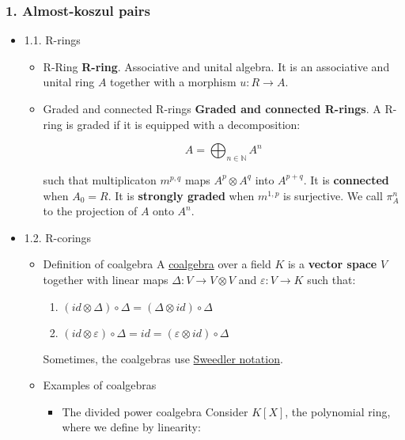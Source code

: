 \documentclass[11pt]{article}
\begin{document}
\subsubsection*{1. Almost-koszul pairs}
\label{sec-1-5-2}
\begin{itemize}
\item 1.1. R-rings
\label{sec-1-5-2-1}
\begin{itemize}
\item R-Ring
\label{sec-1-5-2-1-1}
\textbf{R-ring}. Associative and unital algebra. It is an associative and 
unital ring $A$ together with a morphism $u : R \longrightarrow A$.

\item Graded and connected R-rings
\label{sec-1-5-2-1-2}
\textbf{Graded and connected R-rings}. A R-ring is graded if it is equipped 
with a decomposition:

\[A = \bigoplus_{n \in \mathbb{N}} A^n \]

such that multiplicaton $m^{p,q}$ maps $A^p \otimes A^q$ into $A^{p+q}$. It is \textbf{connected} 
when $A_0 = R$. It is \textbf{strongly graded} when $m^{1,p}$ is surjective. We 
call $\pi^n_A$ to the projection of $A$ onto $A^n$.
\end{itemize}

\item 1.2. R-corings
\label{sec-1-5-2-2}
\begin{itemize}
\item Definition of coalgebra
\label{sec-1-5-2-2-1}
A \href{https://en.wikipedia.org/wiki/Coalgebra#Formal_definition}{coalgebra} over a field $K$ is a \textbf{vector space} $V$ together with linear
maps $\Delta : V \longrightarrow V \otimes V$ and $\varepsilon : V \longrightarrow K$ such that:

\begin{enumerate}
\item $(id \otimes \Delta) \circ \Delta = (\Delta \otimes id) \circ \Delta$
\item $(id \otimes \varepsilon) \circ \Delta = id 
    = (\varepsilon \otimes id) \circ \Delta$
\end{enumerate}

Sometimes, the coalgebras use \href{https://en.wikipedia.org/wiki/Coalgebra#Sweedler_notation}{Sweedler notation}.

\item Examples of coalgebras
\label{sec-1-5-2-2-2}
\begin{itemize}
\item The divided power coalgebra
\label{sec-1-5-2-2-2-1}
Consider $K[X]$, the polynomial ring, where we define by linearity:


\end{itemize}
\end{itemize}
\end{itemize}
\end{document}
